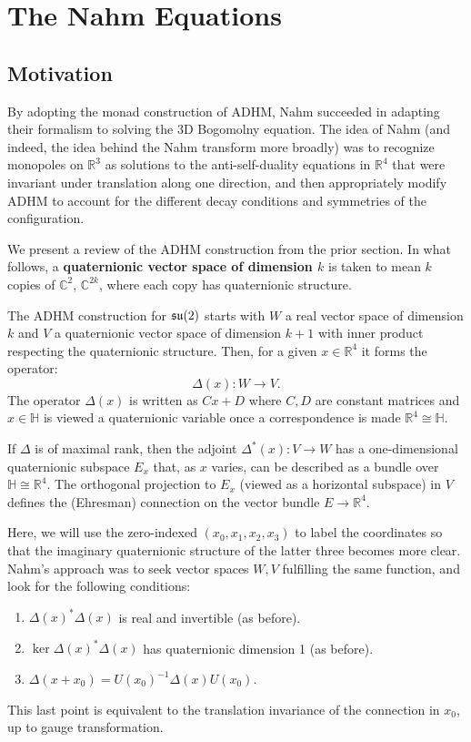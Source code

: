 	\section{The Nahm Equations}
	\subsection{Motivation}
	By adopting the monad construction of ADHM, Nahm succeeded in adapting their formalism to solving the 3D Bogomolny equation. The idea of Nahm (and indeed, the idea behind the Nahm transform more broadly) was to recognize monopoles on $\mathbb R^3$ as solutions to the anti-self-duality equations in $\mathbb R^4$ that were invariant under translation along one direction, and then appropriately modify ADHM to account for the different decay conditions and symmetries of the configuration.

	We present a review of the ADHM construction from the prior section. In what follows, a \textbf{quaternionic vector space of dimension $k$} is taken to mean $k$ copies of $\mathbb C^2$, $\mathbb C^{2k}$, where each copy has quaternionic structure. 

	\begin{review}
		The ADHM construction for $\frak{su}(2)$ starts with $W$ a real vector space of dimension $k$ and $V$ a quaternionic vector space of dimension $k+1$ with inner product respecting the quaternionic structure. Then, for a given $x\in\mathbb R^4$ it forms the operator:
		\begin{equation}
			\Delta(x): W \to V.
		\end{equation}
		The operator $\Delta(x)$ is written as $Cx + D$ where $C, D$ are constant matrices and $x \in \mathbb H$ is viewed a quaternionic variable once a correspondence is made $\mathbb R^4 \cong \mathbb H$.
		
		If $\Delta$ is of maximal rank, then the adjoint $\Delta^*(x): V \to W$ has a one-dimensional quaternionic subspace $E_x$ that, as $x$ varies, can be described as a bundle over $\mathbb H \cong \mathbb R^4$. The orthogonal projection to $E_x$ (viewed as a horizontal subspace) in $V$ defines the (Ehresman) connection on the vector bundle $E \to \mathbb R^4$. \cite{hitchin1983}
	\end{review}

	Here, we will use the zero-indexed $(x_0, x_1, x_2, x_3)$ to label the coordinates so that the imaginary quaternionic structure of the latter three becomes more clear. Nahm's approach \cite{nahm1982} was to seek vector spaces $W, V$ fulfilling the same function, and look for the following conditions:
	\begin{enumerate}
		\item $\Delta(x)^* \Delta(x)$ is real and invertible (as before).
		\item $\ker \Delta(x)^* \Delta(x)$ has quaternionic dimension 1 (as before).
		\item $\Delta(x + x_0) = U(x_0)^{-1} \Delta(x) U(x_0)$.
	\end{enumerate}
	This last point is equivalent to the translation invariance of the connection in $x_0$, up to gauge transformation.


